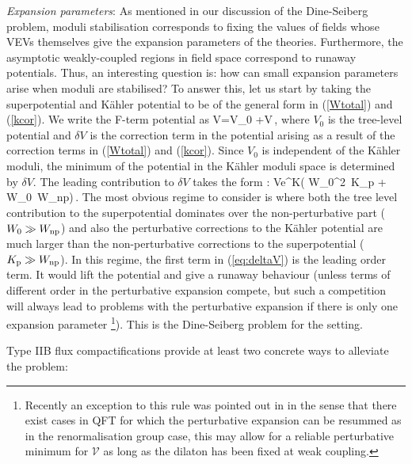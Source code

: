  \item \emph{Expansion parameters}:  As mentioned in our discussion of the Dine-Seiberg problem, moduli stabilisation corresponds to fixing the values of fields whose VEVs themselves give the expansion parameters of the theories. Furthermore, the asymptotic weakly-coupled 
 regions in field space correspond to runaway potentials. Thus, an interesting question is: how can small expansion parameters arise when moduli are stabilised?
To answer this, let us start by taking the superpotential and K\"ahler  potential to be of the general form in (\ref{Wtotal}) and (\ref{kcor}). We write the F-term potential as
\be
V=V_0 +\delta V\,,
\ee
where $V_0$ is the tree-level potential and $\delta V$ is the correction term in the potential arising as a result of the correction terms in (\ref{Wtotal}) and (\ref{kcor}). Since $V_0$ is independent of the  K\"ahler moduli, the minimum of the potential in the K\"ahler moduli space is determined by $\delta V$. The leading contribution to $\delta V$  takes the form \cite{Conlon:2005ki}:
\be
\delta V\propto e^K\left( W_0^2 \,K_{\rm p} + W_0\, W_{\rm np}\right)\,.
\label{eq:deltaV}
\ee 
The most obvious regime to consider is  where both the tree level contribution to the superpotential dominates over the non-perturbative part ($W_0\gg W_{\rm np}$) and also the perturbative corrections to the K\"ahler potential are much larger than the non-perturbative corrections to the superpotential
($K_{\rm p}\gg W_{\rm np}$). In this regime,  the first term in (\ref{eq:deltaV}) is  the leading order term. It would lift the potential and give  a runaway behaviour (unless terms of different order in the perturbative expansion compete,  but such a competition will always lead to problems with the
perturbative expansion if there is only one expansion parameter \footnote{Recently an exception to this rule was pointed out in \cite{Burgess:2022nbx} in the sense that there exist cases in QFT for which the perturbative expansion can be resummed as in the renormalisation group case, this may allow for a reliable perturbative minimum for $\mathcal V$ as long as the dilaton has been fixed at weak coupling.}). This is the Dine-Seiberg problem \cite{Dine:1985he} for the setting. 

Type IIB flux compactifications  provide at least  two concrete ways to alleviate the problem:

